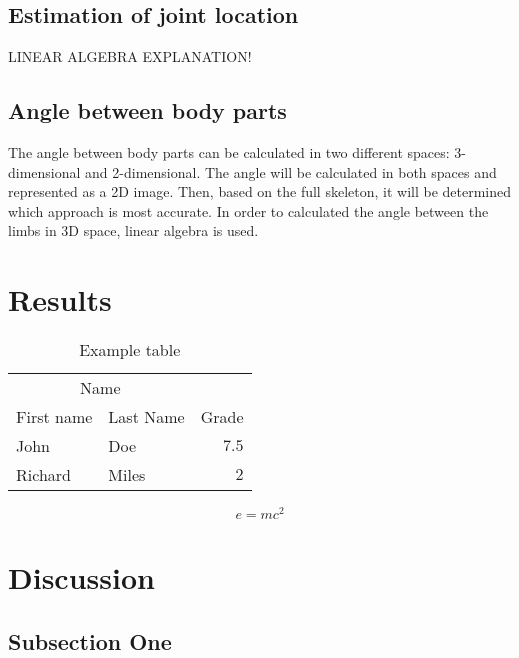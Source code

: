 \documentclass[twoside]{article}
\begin{document}
\begin{multicols}{2}
\subsection{Estimation of joint location}
LINEAR ALGEBRA EXPLANATION!

\subsection{Angle between body parts}
The angle between body parts can be calculated in two different spaces: 3-dimensional and 2-dimensional. The angle will be calculated in both spaces and represented as a 2D image. Then, based on the full skeleton, it will be determined which approach is most accurate. In order to calculated the angle between the limbs in 3D space, linear algebra is used.


\section{Results}

\begin{table}[H]
\caption{Example table}
\centering
\begin{tabular}{llr}
\toprule
\multicolumn{2}{c}{Name} \\
\cmidrule(r){1-2}
First name & Last Name & Grade \\
\midrule
John & Doe & $7.5$ \\
Richard & Miles & $2$ \\
\bottomrule
\end{tabular}
\end{table}

\lipsum[5] %

\begin{equation}
\label{eq:emc}
e = mc^2
\end{equation}

\lipsum[6] %


\section{Discussion}

\subsection{Subsection One}


\end{multicols}
\end{document}
